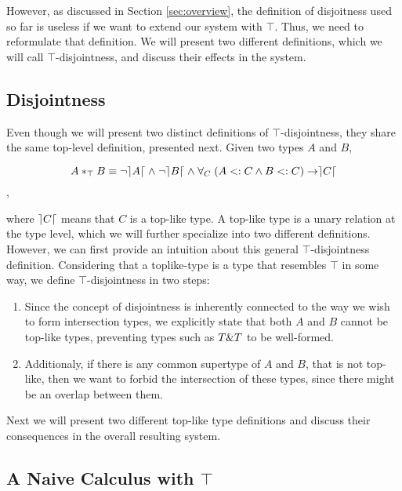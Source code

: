However, as discussed in Section \ref{sec:overview}, the definition of disjoitness used so far 
is useless if we want to extend our system with $\top$.
Thus, we need to reformulate that definition.
We will present two different definitions, which we will call $\top$-disjointness, and discuss their effects in the system.

\subsection{Disjointness} 

Even though we will present two distinct definitions of $\top$-disjointness, they share the same top-level definition, 
presented next.
Given two types $A$ and $B$, 

\[A *_{\top} B \equiv \neg \rceil A \lceil \; \wedge \; \neg \rceil B \lceil \; \wedge \; 
\forall_C \; ( A <: C \wedge B <: C ) \rightarrow \rceil C \lceil \],

where $\rceil C \lceil$ means that $C$ is a top-like type.
A top-like type is a unary relation at the type level, which we will further specialize into two different definitions. 
However, we can first provide an intuition about this general $\top$-disjointness definition.
Considering that a toplike-type is a type that resembles $\top$ in some way, we define $\top$-disjointness in two steps:
\begin{enumerate}
\item Since the concept of disjointness is inherently connected to the way we wish to form intersection types,
we explicitly state that both $A$ and $B$ cannot be top-like types, preventing types such as $T \& T$ to be well-formed.
\item Additionaly, if there is any common supertype of $A$ and $B$, that is not top-like, then we want to forbid the 
intersection of these types, since there might be an overlap between them. 
\end{enumerate}

Next we will present two different top-like type definitions and discuss their consequences in the overall resulting system.

\subsection{A Naive Calculus with $\top$}

